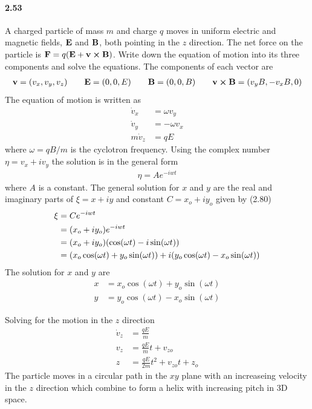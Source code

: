 \documentclass[../problems.tex]{subfiles}
\begin{document}
\paragraph{2.53} A charged particle of mass $m$ and charge $q$ moves in uniform electric and
magnetic fields, $\vb{E}$ and $\vb{B}$, both pointing in the $z$ direction. The net force on the
particle is $\vb{F} = q(\vb{E} + \vb{v} \cp \vb{B})$. Write down the equation of motion into its 
three components and solve the equations.
\barh 
The components of each vector are
\begin{align*}
    \vb{v} = (v_x,v_y,v_z) \qquad \vb{E} = (0,0,E) \qquad \vb{B} = (0,0,B)
        \qquad \vb{v}\cp\vb{B} = (v_yB, -v_xB, 0)
\end{align*}
The equation of motion is written as
\begin{align*}
    \dot{v}_x &= \omega v_y \\
    \dot{v}_y &= -\omega v_x \\
    m \dot{v}_z &= qE
\end{align*}
where $\omega = qB/m$ is the cyclotron frequency. Using the complex number $\eta = v_x + iv_y$ the
solution is in the general form
\begin{align*}
    \eta = Ae^{-iwt}
\end{align*}
where $A$ is a constant. The general solution for $x$ and $y$ are the real and imaginary parts of
$\xi=x+iy$ and constant $C=x_o+iy_o$ given by (2.80)
\begin{align*}
    \xi &= Ce^{-iwt}\\
    &= (x_o + iy_o)e^{-iwt} \\
    &= (x_o + iy_o) \quantity(\cos(\omega t) - i\sin(\omega t)) \\
    &= (x_o\cos(\omega t) + y_o\sin(\omega t)) + i(y_o\cos(\omega t) - x_o\sin(\omega t)) \\
\end{align*}
The solution for $x$ and $y$ are
\begin{align*}
    x &= x_o\cos(\omega t) + y_o\sin(\omega t) \\
    y &= y_o\cos(\omega t) - x_o\sin(\omega t)
\end{align*}

Solving for the motion in the $z$ direction
\begin{align*}
    \dot{v}_z &= \frac{qE}{m} \\
    v_z &= \frac{qE}{m} t + v_{zo} \\
    z &= \frac{qE}{2m} t^2 + v_{zo} t + z_o
\end{align*}
The particle moves in a circular path in the $xy$ plane with an increaseing velocity in the $z$
direction which combine to form a helix with increasing pitch in 3D space.
\end{document}
